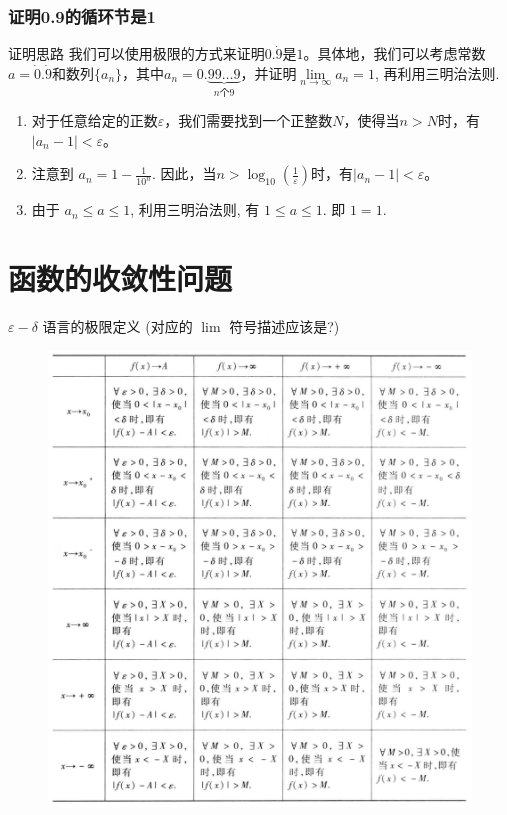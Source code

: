 \documentclass[
10pt,
aspectratio=43,
]{beamer}
\begin{document}
\begin{frame}
	\frametitle{证明0.9的循环节是1}

	\begin{block}{证明思路}
		我们可以使用极限的方式来证明$0.\dot{9}$是$1$。具体地，我们可以考虑常数 $a=\dot0.\dot{9}$和数列$\{a_n\}$，其中$a_n = 0.\underbrace{99\ldots9}_{n \text{个}9}$，并证明$\lim\limits_{n \to \infty} a_n = 1$, 再利用三明治法则.
	\end{block}
	\pause
	\begin{exampleblock}{}
		\begin{enumerate}
			\item 	  对于任意给定的正数$\varepsilon$，我们需要找到一个正整数$N$，使得当$n>N$时，有$|a_n - 1| < \varepsilon$。
			\item 	  注意到 $a_n = 1-\frac{1}{10^n}$. 因此，当$n > \log_{10}\left(\frac{1}{\varepsilon}\right)$时，有$|a_n - 1| < \varepsilon$。
			\item 由于 $a_n\leq a\leq 1$, 利用三明治法则, 有 $1\leq a\leq 1$. 即 $1=1$.
		\end{enumerate}
	\end{exampleblock}
\end{frame}

\section{函数的收敛性问题}
\begin{frame}{$\varepsilon-\delta$ 语言的极限定义 (对应的 $\lim$ 符号描述应该是?)}
	\begin{figure}
		\centering
		\includegraphics[width=\textwidth,height=0.8\textheight,keepaspectratio]{epsilon-delta.png}
	\end{figure}
\end{frame}
\end{document}
